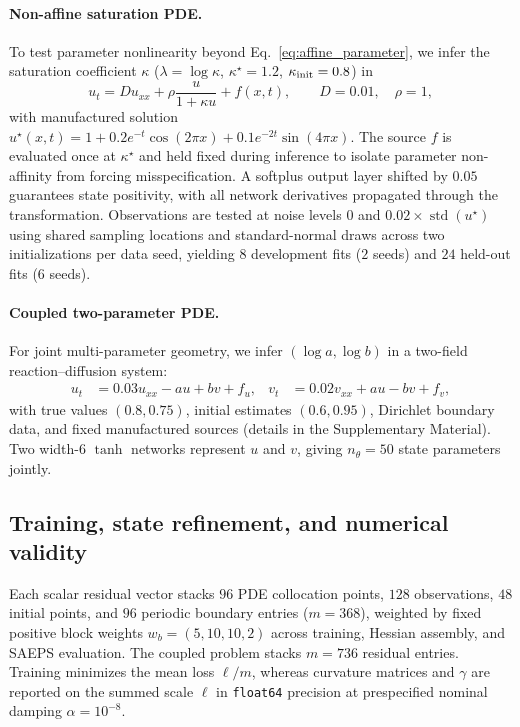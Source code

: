 \documentclass[preprint,11pt]{elsarticle}
\begin{document}
\paragraph{Non-affine saturation PDE.}
To test parameter nonlinearity beyond Eq.~\eqref{eq:affine_parameter}, we infer the saturation coefficient $\kappa$ ($\lambda=\log\kappa$, $\kappa^\star=1.2$, $\kappa_{\rm init}=0.8$) in
\begin{equation}
 u_t=D u_{xx}+\rho\frac{u}{1+\kappa u}+f(x,t),\qquad D=0.01,\quad \rho=1,
 \label{eq:saturation_system}
\end{equation}
with manufactured solution $u^\star(x,t)=1+0.2e^{-t}\cos(2\pi x)+0.1e^{-2t}\sin(4\pi x)$.
The source $f$ is evaluated once at $\kappa^\star$ and held fixed during inference to isolate parameter non-affinity from forcing misspecification.
A softplus output layer shifted by $0.05$ guarantees state positivity, with all network derivatives propagated through the transformation.
Observations are tested at noise levels $0$ and $0.02\times\operatorname{std}(u^\star)$ using shared sampling locations and standard-normal draws across two initializations per data seed, yielding $8$ development fits ($2$ seeds) and $24$ held-out fits ($6$ seeds).

\paragraph{Coupled two-parameter PDE.}
For joint multi-parameter geometry, we infer $(\log a,\log b)$ in a two-field reaction--diffusion system:
\begin{align}
 u_t&=0.03u_{xx}-au+bv+f_u, & v_t&=0.02v_{xx}+au-bv+f_v,
 \label{eq:coupled_system}
\end{align}
with true values $(0.8,0.75)$, initial estimates $(0.6,0.95)$, Dirichlet boundary data, and fixed manufactured sources (details in the Supplementary Material).
Two width-6 $\tanh$ networks represent $u$ and $v$, giving $n_\theta=50$ state parameters jointly.

\subsection{Training, state refinement, and numerical validity}
\label{sec:training_protocol}

Each scalar residual vector stacks $96$ PDE collocation points, $128$ observations, $48$ initial points, and $96$ periodic boundary entries ($m=368$), weighted by fixed positive block weights $w_b=(5,10,10,2)$ across training, Hessian assembly, and SAEPS evaluation.
The coupled problem stacks $m=736$ residual entries.
Training minimizes the mean loss $\ell/m$, whereas curvature matrices and $\gamma$ are reported on the summed scale $\ell$ in \texttt{float64} precision at prespecified nominal damping $\alpha=10^{-8}$.
\end{document}
